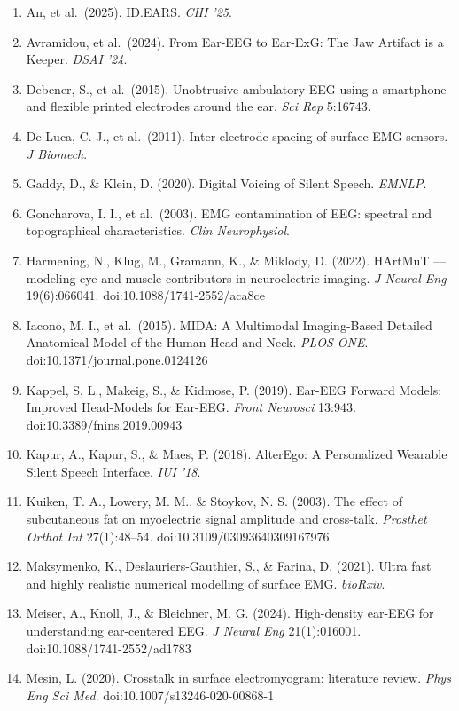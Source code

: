 \documentclass[
  11pt,
]{article}
\providecommand{\tightlist}{%
  \setlength{\itemsep}{0pt}\setlength{\parskip}{0pt}}
\providecommand{\tightlist}{%
  \setlength{\itemsep}{0pt}\setlength{\parskip}{0pt}}
\begin{document}
\begin{enumerate}
\def\labelenumi{\arabic{enumi}.}
\tightlist
\item
  An, et al.~(2025). ID.EARS. \emph{CHI '25}.
\item
  Avramidou, et al.~(2024). From Ear-EEG to Ear-ExG: The Jaw Artifact is a Keeper. \emph{DSAI '24}.
\item
  Debener, S., et al.~(2015). Unobtrusive ambulatory EEG using a smartphone and flexible printed electrodes around the ear. \emph{Sci Rep} 5:16743.
\item
  De Luca, C. J., et al.~(2011). Inter-electrode spacing of surface EMG sensors. \emph{J Biomech}.
\item
  Gaddy, D., \& Klein, D. (2020). Digital Voicing of Silent Speech. \emph{EMNLP}.
\item
  Goncharova, I. I., et al.~(2003). EMG contamination of EEG: spectral and topographical characteristics. \emph{Clin Neurophysiol}.
\item
  Harmening, N., Klug, M., Gramann, K., \& Miklody, D. (2022). HArtMuT --- modeling eye and muscle contributors in neuroelectric imaging. \emph{J Neural Eng} 19(6):066041. doi:10.1088/1741-2552/aca8ce
\item
  Iacono, M. I., et al.~(2015). MIDA: A Multimodal Imaging-Based Detailed Anatomical Model of the Human Head and Neck. \emph{PLOS ONE}. doi:10.1371/journal.pone.0124126
\item
  Kappel, S. L., Makeig, S., \& Kidmose, P. (2019). Ear-EEG Forward Models: Improved Head-Models for Ear-EEG. \emph{Front Neurosci} 13:943. doi:10.3389/fnins.2019.00943
\item
  Kapur, A., Kapur, S., \& Maes, P. (2018). AlterEgo: A Personalized Wearable Silent Speech Interface. \emph{IUI '18}.
\item
  Kuiken, T. A., Lowery, M. M., \& Stoykov, N. S. (2003). The effect of subcutaneous fat on myoelectric signal amplitude and cross-talk. \emph{Prosthet Orthot Int} 27(1):48--54. doi:10.3109/03093640309167976
\item
  Maksymenko, K., Deslauriers-Gauthier, S., \& Farina, D. (2021). Ultra fast and highly realistic numerical modelling of surface EMG. \emph{bioRxiv}.
\item
  Meiser, A., Knoll, J., \& Bleichner, M. G. (2024). High-density ear-EEG for understanding ear-centered EEG. \emph{J Neural Eng} 21(1):016001. doi:10.1088/1741-2552/ad1783
\item
  Mesin, L. (2020). Crosstalk in surface electromyogram: literature review. \emph{Phys Eng Sci Med}. doi:10.1007/s13246-020-00868-1

\end{enumerate}
\end{document}

